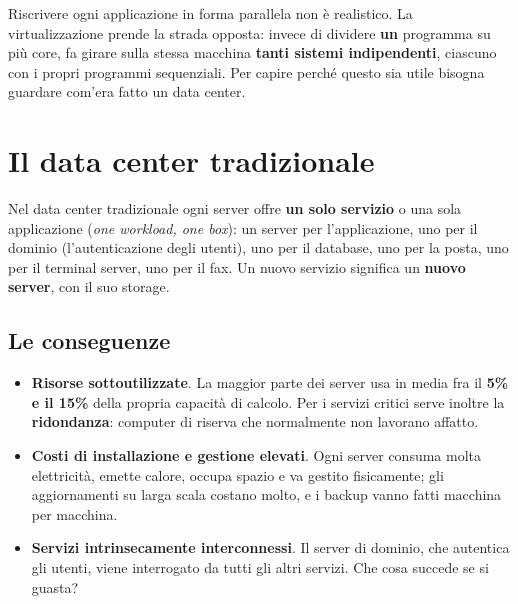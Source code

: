 Riscrivere ogni applicazione in forma parallela non è realistico. La virtualizzazione prende la strada opposta: invece di
dividere \textbf{un} programma su più core, fa girare sulla stessa macchina \textbf{tanti sistemi indipendenti}, ciascuno
con i propri programmi sequenziali. Per capire perché questo sia utile bisogna guardare com'era fatto un data center.

\section{Il data center tradizionale}

Nel data center tradizionale ogni server offre \textbf{un solo servizio} o una sola applicazione (\textit{one workload,
one box}): un server per l'applicazione, uno per il dominio (l'autenticazione degli utenti), uno per il database, uno
per la posta, uno per il terminal server, uno per il fax. Un nuovo servizio significa un \textbf{nuovo server}, con il suo
storage.

\begin{center}
\end{center}

\subsection{Le conseguenze}

\begin{itemize}
  \item \textbf{Risorse sottoutilizzate}. La maggior parte dei server usa in media fra il \textbf{5\% e il 15\%} della
        propria capacità di calcolo. Per i servizi critici serve inoltre la \textbf{ridondanza}: computer di riserva che
        normalmente non lavorano affatto.
  \item \textbf{Costi di installazione e gestione elevati}. Ogni server consuma molta elettricità, emette calore, occupa
        spazio e va gestito fisicamente; gli aggiornamenti su larga scala costano molto, e i backup vanno fatti
        macchina per macchina.
  \item \textbf{Servizi intrinsecamente interconnessi}. Il server di dominio, che autentica gli utenti, viene interrogato
        da tutti gli altri servizi. Che cosa succede se si guasta?
\end{itemize}

